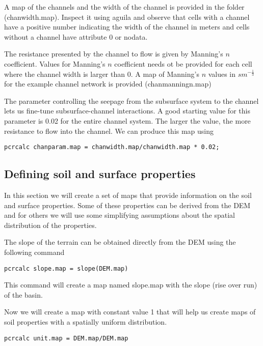 A map of the channels and the width of the channel is provided in the folder (\textsf{chanwidth.map}). Inspect it using aguila and observe that cells with a channel have a positive number indicating the width of the channel in meters and cells without a channel have attribute 0 or nodata.

The resistance presented by the channel to flow is given by Manning's $n$ coefficient. Values for Manning's $n$ coefficient needs ot be provided for each cell where the channel width is larger than 0. A map of Manning's $n$ values in $sm^{-\frac{1}{3}}$ for the example channel network is provided (\textsf{chanmanningn.map})

The parameter controlling the seepage from the subsurface system to the channel lets us fine-tune subsurface-channel interactions. A good starting value for this parameter is 0.02 for the entire channel system. The larger the value, the more resistance to flow into the channel. We can produce this map using 

\begin{verbatim}
pcrcalc chanparam.map = chanwidth.map/chanwidth.map * 0.02;
\end{verbatim}

\subsection{Defining soil and surface properties}

In this section we will create a set of maps that provide information on the soil and surface properties. Some of these properties can be derived from the DEM and for others we will use some simplifying assumptions about the spatial distribution of the properties.

The slope of the terrain can be obtained directly from the DEM using the following command 

\begin{verbatim}
pcrcalc slope.map = slope(DEM.map)
\end{verbatim}

This command will create a map named \textsf{slope.map} with the slope (rise over run) of the basin.

Now we will create a map with constant value 1 that will help us create maps of soil properties with a spatially uniform distribution.  

\begin{verbatim}
pcrcalc unit.map = DEM.map/DEM.map
\end{verbatim}

